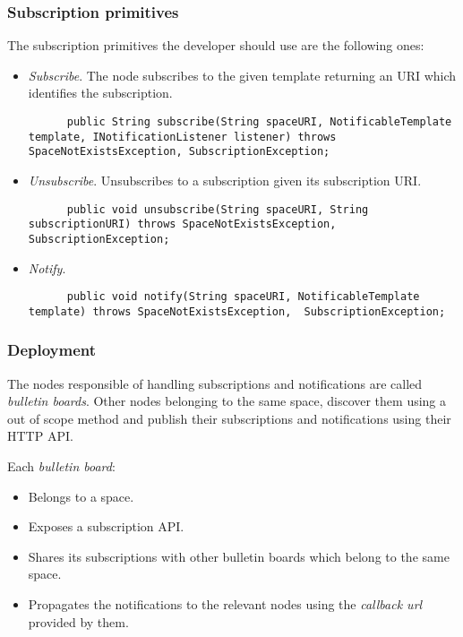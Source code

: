 \subsubsection{Subscription primitives}

The subscription primitives the developer should use are the following ones:
\begin{itemize}
  \item \emph{Subscribe}. The node subscribes to the given template returning an URI which identifies the subscription.
    \begin{verbatim}
      public String subscribe(String spaceURI, NotificableTemplate template, INotificationListener listener) throws SpaceNotExistsException, SubscriptionException;
    \end{verbatim}
  \item \emph{Unsubscribe}. Unsubscribes to a subscription given its subscription URI.
    \begin{verbatim}
      public void unsubscribe(String spaceURI, String subscriptionURI) throws SpaceNotExistsException, SubscriptionException;
    \end{verbatim}
  \item \emph{Notify}.
    \begin{verbatim}
      public void notify(String spaceURI, NotificableTemplate template) throws SpaceNotExistsException,  SubscriptionException;
    \end{verbatim}
\end{itemize}


\subsubsection{Deployment}

The nodes responsible of handling subscriptions and notifications are called \emph{bulletin boards}.
Other nodes belonging to the same space, discover them using a out of scope method and publish their subscriptions and notifications using their HTTP API.

Each \emph{bulletin board}:
\begin{itemize}
  \item Belongs to a space.
  \item Exposes a subscription API.
  \item Shares its subscriptions with other bulletin boards which belong to the same space.
  \item Propagates the notifications to the relevant nodes using the \emph{callback url} provided by them.
\end{itemize}


